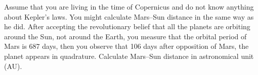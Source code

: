 Assume that you are living in the time of Copernicus and do not know anything
about Kepler's laws. You might calculate Mars--Sun distance in the same way as
he did. After accepting the revolutionary belief that all the planets are
orbiting around the Sun, not around the Earth, you measure that the orbital
period of Mars is 687 days, then you observe that 106 days after opposition of
Mars, the planet appears in quadrature. Calculate Mars--Sun distance in
astronomical unit (AU).

